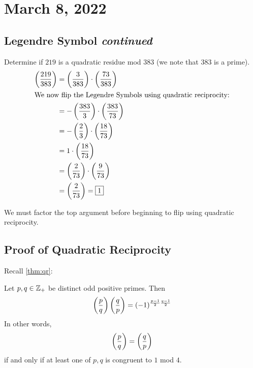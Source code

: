 \section{March 8, 2022}
\subsection{Legendre Symbol \emph{continued}}
\begin{example}\label{example:legendre-symbol}
    Determine if $219$ is a quadratic residue mod $383$ (we note that $383$ is a prime).
    \begin{align*}
        \left(\dfrac{219}{383}\right) & = \left(\dfrac{3}{383}\right)\cdot\left(\dfrac{73}{383}\right)    \\
        \intertext{We now flip the Legendre Symbols using quadratic reciprocity:}
                        & = -\left(\dfrac{383}{3}\right) \cdot \left(\dfrac{383}{73}\right) \\
                        & = -\left(\dfrac{2}{3}\right) \cdot \left(\dfrac{18}{73}\right)    \\
                        & = 1\cdot \left(\dfrac{18}{73}\right)                \\
                        & = \left(\dfrac{2}{73}\right)\cdot\left(\dfrac{9}{73}\right)       \\
                        & = \left(\dfrac{2}{73}\right) = \boxed{1}
    \end{align*}
\end{example}
\begin{remark*}
    We must factor the top argument before beginning to flip using quadratic reciprocity.
\end{remark*}

\subsection{Proof of Quadratic Reciprocity}

Recall \cref{thm:qr}:
\begin{theorem*}
    Let $p, q\in\mathbb Z_+$ be distinct odd positive primes. Then
    \begin{equation*}
        \left(\dfrac{p}{q}\right)\left(\dfrac{q}{p}\right) = (-1)^{\frac{p-1}{2}\frac{q-1}{2}}
    \end{equation*}
    In other words,
    \[\left(\dfrac{p}{q}\right) = \left(\dfrac{q}{p}\right)\]
    if and only if at least one of $p, q$ is congruent to $1$ mod $4$.
\end{theorem*}

